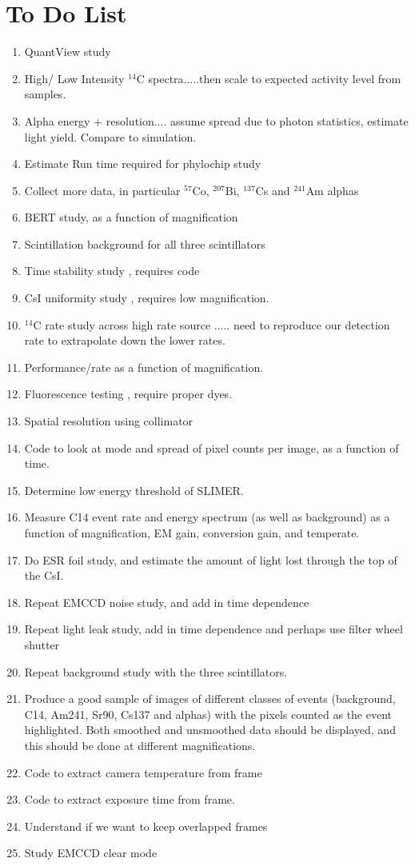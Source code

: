 \documentclass[11pt]{article}
\newcommand{\nuc}[2]{\ensuremath{^{#1}}#2}
\begin{document}
\section{To Do List}
\begin{enumerate}
\item QuantView study 
\item High/ Low Intensity \nuc{14}{C} spectra.....then scale to expected activity level from samples. 
\item Alpha energy + resolution.... assume spread due to photon statistics, estimate light yield. Compare to simulation.
\item Estimate Run time required for phylochip study
\item Collect more data, in particular \nuc{57}{Co}, \nuc{207}{Bi}, \nuc{137}{Cs} and \nuc{241}{Am} alphas
\item BERT study, as a function of magnification
\item Scintillation background for all three scintillators
\item Time stability study , requires code
\item CsI uniformity study , requires low magnification.
\item \nuc{14}{C} rate study across high rate source ..... need to reproduce our detection rate to extrapolate down the lower rates.
\item Performance/rate as a function of magnification.
\item Fluorescence testing , require proper dyes.
\item Spatial resolution using collimator
\item Code to look at mode and spread of pixel counts per image, as a function of time.
\item Determine low energy threshold of SLIMER. 
\item Measure C14 event rate and energy spectrum (as well as background) as a function of magnification, EM gain, conversion gain, and temperate. 
\item Do ESR foil study, and estimate the amount of light lost through the top of the CsI. 
\item Repeat EMCCD noise study, and add in time dependence
\item Repeat light leak study, add in time dependence and perhaps use filter wheel shutter
\item Repeat background study with the three scintillators.
\item Produce a good sample of images of different classes of events (background, C14, Am241, Sr90, Cs137 and alphas) with the pixels counted as the event highlighted. Both smoothed and unsmoothed data should be displayed, and this should be done at different magnifications. 
\item Code to extract camera temperature from frame
\item Code to extract exposure time from frame.
\item Understand if we want to keep overlapped frames
\item Study EMCCD clear mode
\end{enumerate} 
 
 

\end{document}
